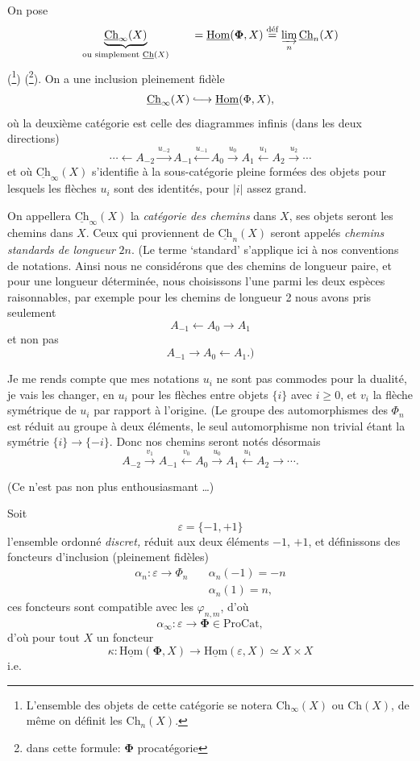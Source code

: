 \documentclass[11pt]{article}
\newcommand{\printedpage}[1]{\marginpar{\footnotesize p.~#1}}
\newcommand{\msp}[1]{\marginpar{\footnotesize [#1]}}
\newcommand{\uHom}{\underline{\mathrm{Hom}}}
\newcommand{\uCh}{\underline{\mathrm{Ch}}}
\newcommand{\bPhi}{\boldsymbol{\Phi}}
\begin{document}
\msp{page 3}
On pose
\[
\underbrace{\uCh_\infty(X)}_{\text{ou simplement }\uCh(X)}\qquad=\uHom(\bPhi,X)\overset{\text{déf}}{=}\varinjlim_n\uCh_n(X)
\]
(\footnote{L'ensemble des objets de cette catégorie se notera $\mathrm{Ch}_\infty(X)$ ou $\mathrm{Ch}(X)$, de même on définit les $\mathrm{Ch}_n(X)$.}) (\footnote{dans cette formule: $\bPhi$ procatégorie}). On a une inclusion pleinement fidèle
\[
\uCh_\infty(X)\lhook\joinrel\longrightarrow\uHom(\Phi,X),
\]
où la deuxième catégorie est celle des diagrammes infinis (dans les deux directions)
\[
\cdots\longleftarrow A_{-2}\xrightarrow{u_{-2}}A_{-1}\xleftarrow{u_{-1}}A_0\xrightarrow{u_0}A_1\xleftarrow{u_1}A_2\xrightarrow{u_2}\cdots
\]
et où $\uCh_\infty(X)$ s'identifie à la sous-catégorie pleine formées des objets pour lesquels les flèches $u_i$ sont des identités, pour $|i|$ assez grand. %

On appellera $\uCh_\infty(X)$ la \textit{catégorie des chemins} dans $X$, ses objets seront les chemins dans $X$. Ceux qui proviennent de $\uCh_n(X)$ seront appelés \textit{chemins standards de longueur} $2n$. (Le terme `standard' s'applique ici à nos conventions de notations. Ainsi nous ne considérons que des chemins de longueur paire, et pour une longueur déterminée, nous choisissons l'une parmi les deux espèces raisonnables, par exemple pour les chemins de longueur 2 nous avons pris seulement
\[
A_{-1}\longleftarrow A_0\longrightarrow A_1
\]
et non pas
\[
A_{-1}\longrightarrow A_0\longleftarrow A_1.)
\]

\msp{page 4}
Je me rends compte que mes notations $u_i$ ne sont pas commodes pour la dualité, je vais les changer, en $u_i$ pour les flèches entre objets $\{i\}$ avec $i\ge0$, et $v_i$ la flèche symétrique de $u_i$ par rapport à l'origine. (Le groupe des automorphismes des $\Phi_n$ est réduit au groupe à deux éléments, le seul automorphisme non trivial étant la symétrie $\{i\}\longrightarrow\{-i\}$. Donc nos chemins seront notés désormais %
\[
A_{-2}\xrightarrow{v_1}A_{-1}\xleftarrow{v_0}A_0\xrightarrow{u_0}A_1\xleftarrow{u_1}A_2\longrightarrow\cdots.
\tag*{$(*)$}
\]

\printedpage{4}

(Ce n'est pas non plus enthousiasmant \dots)

Soit
\[
\varepsilon=\{-1,+1\}
\]
l'ensemble ordonné \textit{discret,} réduit aux deux éléments $-1$, $+1$, et définissons des foncteurs d'inclusion (pleinement fidèles)
\[
\begin{aligned}
\alpha_n:\varepsilon\longrightarrow\Phi_n\quad & \alpha_n(-1)=-n\\
& \alpha_n(1)=n,
\end{aligned}
\]
ces foncteurs sont compatible avec les $\varphi_{n,m}$, d'où %
\[
\alpha_\infty:\varepsilon\longrightarrow\boldsymbol{\Phi}\in\mathrm{ProCat},
\]
d'où pour tout $X$ un foncteur
\[
\kappa:\uHom(\boldsymbol{\Phi},X)\longrightarrow\uHom(\varepsilon,X)\simeq X\times X
\]
i.e.
\end{document}
